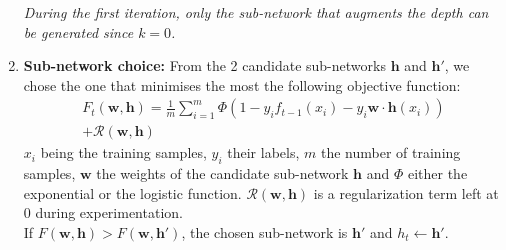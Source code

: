 \documentclass[11 pt]{article}
\begin{document}
\begin{enumerate}
	\textit{During the first iteration, only the sub-network that augments the depth can be generated since \(k=0\).}
	\item \textbf{Sub-network choice: }From the 2 candidate sub-networks \(\mathbf{h}\) and \(\mathbf{h'}\), we chose the one that minimises the most the following objective function:
	\begin{multline*}
		F_t(\mathbf{w,h}) = \frac{1}{m}\sum^m_{i=1}\Phi(1-y_if_{t-1}(x_i)-y_i\mathbf{w\cdot h}(x_i)) \\
        + \mathcal{R}(\mathbf{w,h})
	\end{multline*}
	\(x_i\) being the training samples, \(y_i\) their labels, \(m\) the number of training samples, \(\mathbf{w}\) the weights of the candidate sub-network \(\mathbf{h}\) and \(\Phi\) either the exponential or the logistic function. \(\mathcal{R}(\mathbf{w,h})\) is a regularization term left at \(0\) during experimentation.\\
	If \(F(\mathbf{w,h}) > F(\mathbf{w, h'})\), the chosen sub-network is \(\mathbf{h'}\) and \(h_t\leftarrow\mathbf{h'}\).

\end{enumerate}
\end{document}
